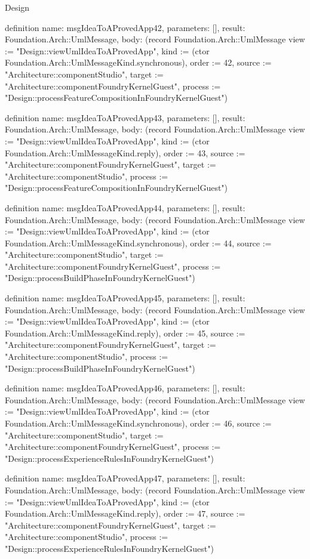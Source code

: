 \begin{lexlean}{Design}
\begin{semanticmodule}
definition{
  name: msgIdeaToAProvedApp42,
  parameters: [],
  result: Foundation.Arch::UmlMessage,
  body: (record Foundation.Arch::UmlMessage {view := "Design::viewUmlIdeaToAProvedApp", kind := (ctor Foundation.Arch::UmlMessageKind.synchronous), order := 42, source := "Architecture::componentStudio", target := "Architecture::componentFoundryKernelGuest", process := "Design::processFeatureCompositionInFoundryKernelGuest"})
}

definition{
  name: msgIdeaToAProvedApp43,
  parameters: [],
  result: Foundation.Arch::UmlMessage,
  body: (record Foundation.Arch::UmlMessage {view := "Design::viewUmlIdeaToAProvedApp", kind := (ctor Foundation.Arch::UmlMessageKind.reply), order := 43, source := "Architecture::componentFoundryKernelGuest", target := "Architecture::componentStudio", process := "Design::processFeatureCompositionInFoundryKernelGuest"})
}

definition{
  name: msgIdeaToAProvedApp44,
  parameters: [],
  result: Foundation.Arch::UmlMessage,
  body: (record Foundation.Arch::UmlMessage {view := "Design::viewUmlIdeaToAProvedApp", kind := (ctor Foundation.Arch::UmlMessageKind.synchronous), order := 44, source := "Architecture::componentStudio", target := "Architecture::componentFoundryKernelGuest", process := "Design::processBuildPhaseInFoundryKernelGuest"})
}

definition{
  name: msgIdeaToAProvedApp45,
  parameters: [],
  result: Foundation.Arch::UmlMessage,
  body: (record Foundation.Arch::UmlMessage {view := "Design::viewUmlIdeaToAProvedApp", kind := (ctor Foundation.Arch::UmlMessageKind.reply), order := 45, source := "Architecture::componentFoundryKernelGuest", target := "Architecture::componentStudio", process := "Design::processBuildPhaseInFoundryKernelGuest"})
}

definition{
  name: msgIdeaToAProvedApp46,
  parameters: [],
  result: Foundation.Arch::UmlMessage,
  body: (record Foundation.Arch::UmlMessage {view := "Design::viewUmlIdeaToAProvedApp", kind := (ctor Foundation.Arch::UmlMessageKind.synchronous), order := 46, source := "Architecture::componentStudio", target := "Architecture::componentFoundryKernelGuest", process := "Design::processExperienceRulesInFoundryKernelGuest"})
}

definition{
  name: msgIdeaToAProvedApp47,
  parameters: [],
  result: Foundation.Arch::UmlMessage,
  body: (record Foundation.Arch::UmlMessage {view := "Design::viewUmlIdeaToAProvedApp", kind := (ctor Foundation.Arch::UmlMessageKind.reply), order := 47, source := "Architecture::componentFoundryKernelGuest", target := "Architecture::componentStudio", process := "Design::processExperienceRulesInFoundryKernelGuest"})
}


\end{semanticmodule}
\end{lexlean}

